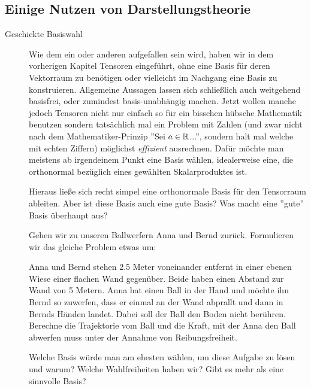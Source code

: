 
\subsection{Einige Nutzen von Darstellungstheorie}
\begin{description}
\item[Geschickte Basiswahl]
Wie dem ein oder anderen aufgefallen sein wird, haben wir in dem vorherigen Kapitel Tensoren eingeführt, ohne eine Basis für deren Vektorraum zu benötigen oder vielleicht im Nachgang eine Basis zu konstruieren. Allgemeine Aussagen lassen sich schließlich auch weitgehend basisfrei, oder zumindest basis-unabhängig machen. 
Jetzt wollen manche jedoch Tensoren nicht nur einfach so für ein bisschen hübsche Mathematik benutzen sondern tatsächlich mal ein Problem mit Zahlen (und zwar nicht nach dem Mathematiker-Prinzip ''Sei $a\in \mathbb{R}$...'', sondern halt mal welche mit echten Ziffern) möglichst \emph{effizient} ausrechnen. Dafür möchte man meistens ab irgendeinem Punkt eine Basis wählen, idealerweise eine, die orthonormal bezüglich eines gewählten Skalarproduktes ist. 

\medbreak
 Hieraus ließe sich recht simpel eine orthonormale Basis für den Tensorraum ableiten. Aber ist diese Basis auch eine gute Basis? Was macht eine ''gute'' Basis überhaupt aus?

\medbreak
Gehen wir zu unseren Ballwerfern Anna und Bernd zurück. Formulieren wir das gleiche Problem etwas um:

\begin{gridmp}{\linewidth}
	{\selectfont
	Anna und Bernd stehen 2.5 Meter voneinander entfernt in einer ebenen Wiese einer flachen Wand gegenüber. Beide haben einen Abstand zur Wand von 5 Metern. Anna hat einen Ball in der Hand und möchte ihn Bernd so zuwerfen, dass er einmal an der Wand abprallt und dann in Bernds Händen landet. Dabei soll der Ball den Boden nicht berühren. Berechne die Trajektorie vom Ball und die Kraft, mit der Anna den Ball abwerfen muss unter der Annahme von Reibungsfreiheit.}
	\vspace{8cm}
\end{gridmp}

Welche Basis würde man am ehesten wählen, um diese Aufgabe zu lösen und warum? Welche Wahlfreiheiten haben wir? Gibt es mehr als eine sinnvolle Basis?



\end{description}
